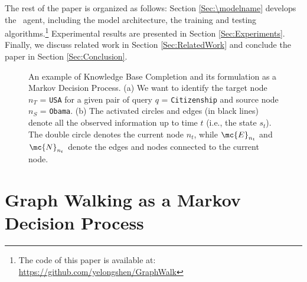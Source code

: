\documentclass{article}
\begin{document}
	The rest of the paper is organized as follows: Section \ref{Sec:\modelname} develops the \modelname~agent, including the model architecture, the training and testing algorithms.\footnote{The code of this paper is available at: \url{https://github.com/yelongshen/GraphWalk}} Experimental results are presented in Section \ref{Sec:Experiments}. Finally, we discuss related work in Section \ref{Sec:RelatedWork} and conclude the paper in Section \ref{Sec:Conclusion}.
	
    
    \begin{figure}[t!]
    \centerline{
    }%
    \caption{{\small An example of Knowledge Base Completion and its formulation as a Markov Decision Process. (a) We want to identify the target node $n_T$ = \texttt{USA} for a given pair of query $q$ = \texttt{Citizenship} and source node $n_S$ = \texttt{Obama}. (b) The activated circles and edges (in black lines) denote all the observed information up to time $t$ (i.e., the state $s_t$). The double circle denotes the current node $n_t$, while $\mc{E}_{n_t}$ and $\mc{N}_{n_t}$ denote the edges and nodes connected to the current node.}}
    \end{figure}
	
	
	\section{Graph Walking as a Markov Decision Process}
	\label{Sec:MDPformulation}
	
\end{document}
